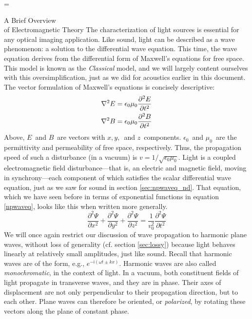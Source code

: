 \documentclass[a4paper,10pt]{report}
\makeatletter
\numberwithin{equation}{section}
\let\realnormalsize=\normalsize
\def\liih@math{\ifmmode$\else\bad@math\fi}
\def\adjustnormalsize{\def\normalsize{\mathsurround=0pt \realnormalsize
 \parindent=0pt\abovedisplayskip=0pt\belowdisplayskip=0pt}%
 \def\phantompar{\csname par\endcsname}\normalsize}%
\newcommand\lthtmlvboxmathA{\adjustnormalsize\setbox\sizebox=\vbox\bgroup %
 \let\ifinner=\iffalse \let\)\liih@math }%
\newcommand\lthtmlmathtype[1]{\gdef\lthtmlmathenv{#1}}%
\newcommand\lthtmlfigureA[1]{\let\@savefreelist\@freelist
       \lthtmlmathtype{#1}\lthtmlvboxmathA}%
\makeatother
\begin{document}
{\newpage\clearpage
\lthtmlfigureA{section1239}%
\begin{section}
{A Brief Overview \\of Electromagnetic Theory}
 The characterization of light sources is essential for any optical imaging application. Like sound, light can be described as a wave phenomenon: a solution to the differential wave equation. This time, the wave equation derives from the differential form of Maxwell's equations for free space. This model is known as the \emph{Classical} model, and we will largely content ourselves with this oversimplification, just as we did for acoustics earlier in this document. The vector formulation of Maxwell's equations is concisely descriptive: \cite[p.~44]{Hecht1987}
\begin{align}
\nabla^2 E &= \epsilon_0 \mu_0 \frac{\partial^2 E}{\partial t^2} \notag\\
\nabla^2 B &= \epsilon_0 \mu_0 \frac{\partial^2 B}{\partial t^2}
\end{align}
Above, $E$\  and $B$\  are vectors with $x, y,$\  and $z$\  components. $\epsilon_0$\  and $\mu_0$\  are the permittivity and permeability of free space, respectively. Thus, the propagation speed of such a disturbance (in a vacuum) is $v = 1/\sqrt{\epsilon_0 \mu_0}$. Light is a coupled electromagnetic field disturbance---that is, an electric and magnetic field, moving in synchrony---each component of which satisfies the scalar differential wave equation, just as we saw for sound in section \ref{sec:npwaveq_nd}. That equation, which we have seen before in terms of exponential functions in equation \eqref{npwaveq}, looks like this when written more generally. \cite[p.~44]{Hecht1987}
\begin{equation}
\frac{\partial^2\Psi}{\partial x^2} + \frac{\partial^2 \Psi}{\partial y^2} + \frac{\partial^2 \Psi}{\partial z^2}= \frac{1}{v_0^2}\frac{\partial^2\Psi}{\partial t^2}
\end{equation}
We will once again restrict our discussion of wave propagation to harmonic plane waves, without loss of generality (cf. section \ref{sec:lossy}) because light behaves linearly at relatively small amplitudes, just like sound.\cite[p.~286]{Hecht1987} Recall that harmonic waves are of the form, e.g., $e^{-\mathsf{i}(\omega t \pm kx)}$. Harmonic waves are also called \emph{monochromatic}, in the context of light. In a vacuum, both constituent fields of light propagate in transverse waves, and they are in phase. Their axes of displacement are not only perpendicular to their propagation direction, but to each other.  Plane waves can therefore be oriented, or \emph{polarized}, by rotating these vectors along the plane of constant phase.\cite[p.~45]{Hecht1987}

\end{section}}
\end{document}
